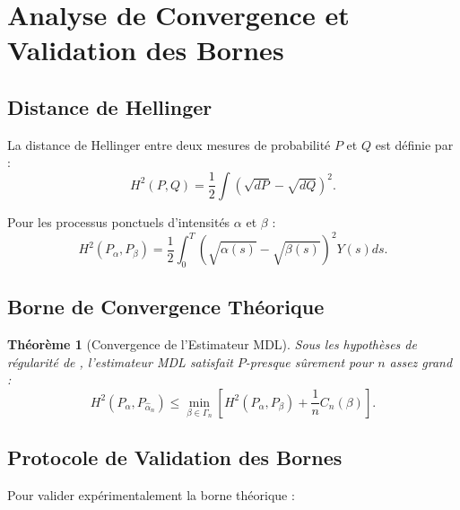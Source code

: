 \documentclass[12pt,a4paper]{article}
\newtheorem{theorem}{Théorème}[section]
\begin{document}
	\section{Analyse de Convergence et Validation des Bornes}
	\label{sec:convergence}
	
	\subsection{Distance de Hellinger}
	\label{subsec:distance_hellinger}
	
	La distance de Hellinger entre deux mesures de probabilité $P$ et $Q$ est définie par :
	\begin{equation}
		H^2(P, Q) = \frac{1}{2} \int \left( \sqrt{dP} - \sqrt{dQ} \right)^2.
	\end{equation}
	
	Pour les processus ponctuels d'intensités $\alpha$ et $\beta$ :
	\begin{equation}
		H^2(P_{\alpha}, P_{\beta}) = \frac{1}{2} \int_0^T \left( \sqrt{\alpha(s)} - \sqrt{\beta(s)} \right)^2 Y(s) ds.
	\end{equation}
	
	\subsection{Borne de Convergence Théorique}
	\label{subsec:borne_convergence}
	
	\begin{theorem}[Convergence de l'Estimateur MDL]
		\label{thm:convergence_mdl}
		Sous les hypothèses de régularité de \cite{versatile_main.tex}, l'estimateur MDL satisfait $P$-presque sûrement pour $n$ assez grand :
		\begin{equation}
			H^2(P_{\alpha}, P_{\hat{\alpha}_n}) \leq \min_{\beta \in \Gamma_n} \left[ H^2(P_{\alpha}, P_{\beta}) + \frac{1}{n} C_n(\beta) \right].
		\end{equation}
	\end{theorem}
	
	\subsection{Protocole de Validation des Bornes}
	\label{subsec:protocole_validation}
	
	Pour valider expérimentalement la borne théorique :
	
\end{document}
